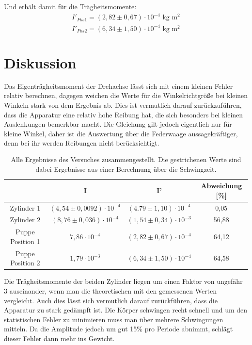 Und erhält damit für die Trägheitsmomente:
\begin{align*}
I'_{Pos 1}=(2,82 \pm0,67)\cdot 10^{-4} \text{ kg m$^2$}\\
I'_{Pos 2}=(6,34 \pm1,50)\cdot 10^{-4} \text{ kg m$^2$}
\end{align*}

\section{Diskussion}
Das Eigenträgheitsmoment der Drehachse lässt sich mit einem kleinen Fehler relativ berechnen, dagegen weichen die Werte für die Winkelrichtgröße bei kleinen Winkeln stark von dem Ergebnis ab. Dies ist vermutlich darauf zurückzuführen, dass die Apparatur eine relativ hohe Reibung hat, die sich besonders bei kleinen Auslenkungen bemerkbar macht. Die Gleichung gilt jedoch eigentlich nur für kleine Winkel, daher ist die Auswertung über die Federwaage aussagekräftiger, denn bei ihr werden Reibungen nicht berücksichtigt.
\begin{table}[htbp]
\begin{tabular}{|c|c|c|c|}
\hline 
 & I & I' & Abweichung [\%] \\ \hline 
Zylinder 1 & $(4,54\pm0,0092)\cdot10^{-4}$ & $(4.79\pm1,10)\cdot10^{-4}$ & 0,05 \\ \hline 
Zylinder 2 & $(8,76\pm0,036)\cdot10^{-4}$ & $(1,54\pm0,34)\cdot10^{-3}$ & 56,88 \\ \hline 
Puppe Position 1 & $7,86\cdot 10^{-4}$ & $(2,82 \pm0,67)\cdot 10^{-4}$ & 64,12 \\ \hline 
Puppe Position 2 & $1,79\cdot 10^{-3}$ & $(6,34 \pm1,50)\cdot 10^{-4}$ & 64,58 \\ \hline 
\end{tabular} 
\caption{Alle Ergebnisse des Versuches zusammengestellt. Die gestrichenen Werte sind dabei Ergebnisse aus einer Berechnung über die Schwingzeit.}
\end{table}

Die Trägheitsmomente der beiden Zylinder liegen um einen Faktor von ungefähr 3 auseinander, wenn man die theoretischen mit den gemessenen Werten vergleicht. Auch dies lässt sich vermutlich darauf zurückführen, dass die Apparatur zu stark gedämpft ist. Die Körper schwingen recht schnell und um den statistischen Fehler zu minimieren muss man über mehrere Schwingungen mitteln. Da die Amplitude jedoch um gut 15\% pro Periode abnimmt, schlägt dieser Fehler dann mehr ins Gewicht.

